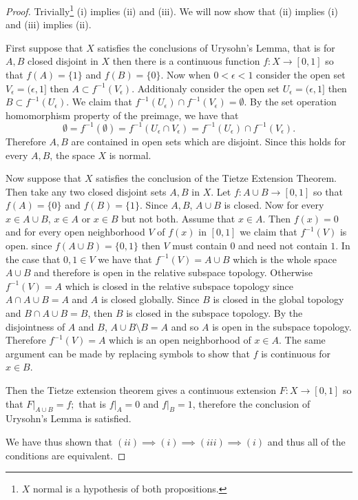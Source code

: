 \documentclass[11pt]{amsart}
\theoremstyle{definition}
\numberwithin{theorem}{section}
\numberwithin{definition}{section}
\numberwithin{equation}{section}
\begin{document}
\begin{proof}
	Trivially\footnote{$X$ normal is a hypothesis of both propositions.} (i) implies (ii) and (iii). We will now show that (ii) implies (i) and (iii) implies (ii).

	First suppose that $X$ satisfies the conclusions of Urysohn's Lemma, that is for $A, B$ closed disjoint in $X$ then
	there is a continuous function $f: X \to [0,1]$ so that $f(A)= \{1\}$ and $f(B) = \{0\}.$ Now when $0< \epsilon < 1$ consider the open set $V_\epsilon = (\epsilon, 1]$ then $A \subset f^{-1}(V_\epsilon)$.  Additionaly consider the open set $U_\epsilon = (\epsilon, 1]$ then $B \subset f^{-1}(U_\epsilon)$. We claim that $f^{-1}(U_\epsilon) \cap f^{-1}(V_\epsilon) = \emptyset.$ By the set operation homomorphism property of the preimage, we have that $$ \emptyset = f^{-1}(\emptyset)  =f^{-1}(U_\epsilon \cap V_\epsilon) = f^{-1}(U_\epsilon) \cap f^{-1}(V_\epsilon).$$
	Therefore $A, B$ are contained in open sets which are disjoint. Since this holds for every $A, B$, the space $X$ is normal.

	Now suppose that $X$ satisfies the conclusion of the Tietze Extension Theorem. Then take any two closed disjoint sets $A, B$ in $X$. Let $f: A \cup B \to [0,1]$ so that $f(A) = \{0\}$ and $f(B) = \{1\}.$ Since $A, B$, $A \cup B$ is closed. Now for every $x \in A \cup B$, $x \in A$ or $x \in B$ but not both. Assume that $x \in A$. Then
	$f(x) = 0$ and for every open neighborhood $V$ of $f(x)$ in $[0,1]$ we claim that $f^{-1}(V)$ is open. since $f(A \cup B) = \{0, 1\}$ then $V$ must contain $0$ and need not contain $1$. In the case that $0, 1 \in V$ we have that
	$f^{-1}(V) = A \cup B$ which is the whole space $A \cup B$ and therefore is open in the relative subspace topology. Otherwise $f^{-1}(V) = A$ which is closed in the relative subspace topology since $A \cap A \cup B = A$ and $A$ is closed globally. Since $B$ is closed in the global topology and $B \cap A \cup B = B$, then $B$ is closed in the subspace topology. By the disjointness of $A$ and $B$, $A \cup B \setminus B = A$ and so $A$ is open in the subspace topology. Therefore $f^{-1}(V) = A$ which is an open neighborhood of $x \in A$. The same argument can be made by replacing symbols to show that $f$ is continuous for $x \in B$.

	Then the Tietze extension theorem gives a continuous extension $F: X \to [0,1]$ so that $F|_{A \cup B} = f;$ that is $f|_A = 0$ and $f|_B = 1$, therefore the conclusion of Urysohn's Lemma is satisfied.

	We have thus shown that $(ii) \implies (i) \implies (iii) \implies (i)$ and thus all of the conditions are equivalent.
\end{proof}
\end{document}
